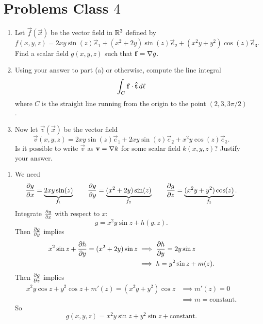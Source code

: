 \documentclass[10pt, a4paper]{article}
\begin{document}
\newpage

\section{Problems Class \texorpdfstring{$4$}{}}

\begin{problem}[$2019$ Question $3$]\phantom{}
    \begin{enumerate}[label = (\alph*)]
        \item Let $\vec{f}(\vec{x})$ be the vector field in $\R ^ 3$ defined by
        \[
        f(x, y, z) = 2xy\sin(z)\vec{e}_1 + (x ^ 2 + 2y)\sin(z)\vec{e}_2 + (x ^ 2y + y ^ 2)\cos(z)\vec{e}_3.
        \]
        Find a scalar field $g(x, y, z)$ such that $\vec{f} = \bnabla g$.

        \item Using your answer to part
        (a)
        or otherwise,
        compute the line integral
        \[
        \int_{C}\vec{f}\cdot\hvec{t}\,d\ell
        \]
        where $C$ is the straight line running from the origin to the point $(2, 3, 3\pi / 2)$.

        \item Now let $\vec{v}(\vec{x})$ be the vector field
        \[
        \vec{v}(x, y, z) = 2xy\sin(z)\vec{e}_1 + 2xy\sin(z)\vec{e}_2 + x ^ 2y\cos(z)\vec{e}_3.
        \]
        Is it possible to write $\vec{v}$ as $\vec{v} = \bnabla k$ for some scalar field $k(x, y, z)$?
        Justify your answer.
    \end{enumerate}

    \begin{solution}\phantom{}
        \begin{enumerate}[label = (\alph*)]
            \item
            We need
            \[
            \pd[g]{x} = \underbrace{2xy\sin(z)}_{f_1}\qquad\pd[g]{y} = \underbrace{(x ^ 2 + 2y)\sin(z)}_{f_2}\qquad\pd[g]{z} = \underbrace{(x ^ 2y + y ^ 2)\cos(z)}_{f_3}.
            \]
            Integrate $\pd[g]{x}$ with respect to $x$:
            \[
            g = x ^ 2y\sin{z} + h(y, z).
            \]
            Then $\pd[g]{y}$ implies
            \begin{align*}
                x ^ 2\sin{z} + \pd[h]{y} = (x ^ 2 + 2y)\sin{z} &\implies \pd[h]{y} = 2y\sin{z} \\
                &\implies h = y ^ 2\sin{z} + m(z).
            \end{align*}
            Then $\pd[g]{z}$ implies
            \begin{align*}
                x ^ 2y\cos{z} + y ^ 2\cos{z} + m'(z) = (x ^ 2y + y ^ 2)\cos{z} &\implies m'(z) = 0 \\
                &\implies m = \text{constant}.
            \end{align*}
            So
            \[
            g(x, y, z) = x ^ 2y\sin{z} + y ^ 2\sin{z} + \text{constant}.
            \]


\end{enumerate}
\end{solution}
\end{problem}
\end{document}
